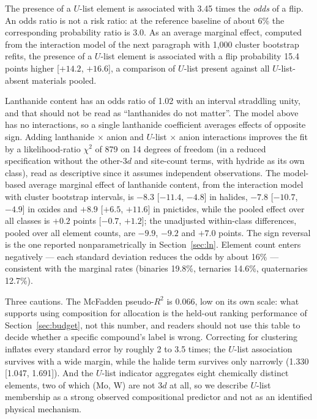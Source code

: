 \documentclass[11pt]{article}
\begin{document}
The presence of a $U$-list element is associated with 3.45 times the \emph{odds} of a flip. An odds
ratio is not a risk ratio: at the reference baseline of about 6\% the corresponding
probability ratio is 3.0. As an average marginal effect, computed from the interaction
model of the next paragraph with 1{,}000 cluster bootstrap refits, the presence of a
$U$-list element is associated with a flip probability 15.4 points higher [$+14.2$,
$+16.6$], a comparison of $U$-list present against all $U$-list-absent materials pooled.

Lanthanide content has an odds ratio of 1.02 with an interval straddling unity, and that
should not be read as ``lanthanides do not matter''. The model above has no
interactions, so a single lanthanide coefficient averages effects of opposite sign.
Adding lanthanide $\times$ anion and $U$-list $\times$ anion interactions improves the
fit by a likelihood-ratio $\chi^2$ of 879 on 14 degrees of freedom (in a reduced
specification without the other-3$d$ and site-count terms, with hydride as its own class), read as descriptive
since it assumes independent observations. The model-based
average marginal effect of lanthanide content, from the interaction model with
cluster bootstrap intervals, is $-8.3$ [$-11.4$, $-4.8$] in halides, $-7.8$ [$-10.7$,
$-4.9$] in oxides and $+8.9$ [$+6.5$, $+11.6$] in pnictides, while the pooled effect
over all classes is $+0.2$ points [$-0.7$, $+1.2$]; the unadjusted within-class
differences, pooled over all element counts, are $-9.9$, $-9.2$ and $+7.0$ points. The sign reversal is the one reported
nonparametrically in Section~\ref{sec:ln}. Element count enters negatively --- each
standard deviation reduces the odds by about 16\% --- consistent with the marginal rates
(binaries 19.8\%, ternaries 14.6\%, quaternaries 12.7\%).

Three cautions. The McFadden pseudo-$R^2$ is 0.066, low on its own scale: what supports
using composition for allocation is the held-out ranking performance of
Section~\ref{sec:budget}, not this number, and readers should not use this table to
decide whether a specific compound's label is wrong. Correcting for clustering inflates
every standard error by roughly 2 to 3.5 times; the $U$-list association survives with
a wide margin, while the halide term survives only narrowly (1.330 [1.047, 1.691]).
And the $U$-list indicator aggregates eight chemically distinct elements, two of which
(Mo, W) are not 3$d$ at all, so we describe $U$-list membership as a strong observed
compositional predictor and not as an identified physical mechanism.
\end{document}
